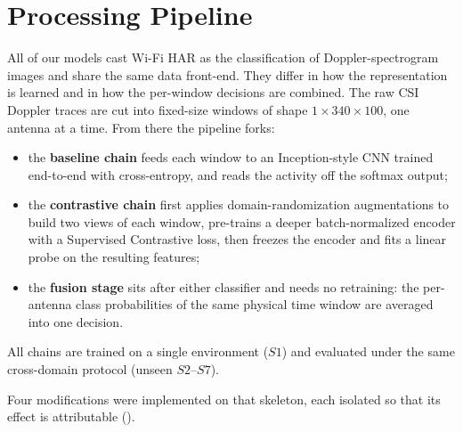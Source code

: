 
\section{Processing Pipeline}
\label{sec:processing_architecture}

All of our models cast Wi-Fi HAR as the classification of Doppler-spectrogram
images and share the same data front-end. They differ in how the
representation is learned and in how the per-window decisions are
combined. The raw CSI Doppler traces are cut into fixed-size
windows of shape $1\times340\times100$, one antenna at a time.
From there the pipeline forks:
\begin{itemize}
  \item the \textbf{baseline chain} feeds each window to an
  Inception-style CNN trained end-to-end with cross-entropy, and reads the
  activity off the softmax output;
  \item the \textbf{contrastive chain} first applies
  domain-randomization augmentations to build two views of each window, pre-trains
  a deeper batch-normalized encoder with a Supervised Contrastive loss, then
  freezes the encoder and fits a linear probe on the resulting features;
  \item the \textbf{fusion stage} sits after either classifier and needs
  no retraining: the per-antenna class probabilities of the same physical time
  window are averaged into one decision.
\end{itemize}
All chains are trained on a single environment ($S1$) and evaluated under the
same cross-domain protocol (unseen $S2$--$S7$).

Four modifications were implemented on that skeleton, each isolated so that its
effect is attributable ().

